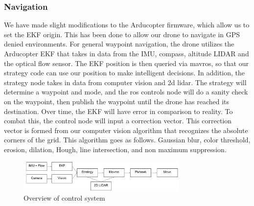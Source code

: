 \documentclass[12pt,letterpaper]{article}
\begin{document}
		\subsubsection*{Navigation}
			We have made slight modifications to the Arducopter firmware, which allow us to set the EKF origin.  This has been done to allow our drone to navigate in GPS denied environments.  For general waypoint navigation, the drone utilizes the Arducopter EKF that takes in data from the  IMU, compass, altitude LIDAR and the optical flow sensor. The EKF position is then queried via mavros, so that our strategy code can use our position to make intelligent decisions. In addition, the strategy node takes in data from computer vision and 2d lidar. The strategy will determine a waypoint and mode, and the ros controls node will do a sanity check on the waypoint, then publish the waypoint until the drone has reached its destination. Over time, the EKF will have error in comparison to reality. To combat this, the control node will input a correction vector.  This correction vector is formed from our computer vision algorithm that recognizes the absolute corners of the grid. This algorithm goes as follows. Gaussian blur, color threshold, erosion, dilation, Hough, line intersection, and non maximum suppression. 

		\begin{figure}[!htbp]
		\begin{center}
		\includegraphics[width=0.75\textwidth]{system}
		\caption*{Overview of control system}
		\end{center}
		\end{figure}

\end{document}
